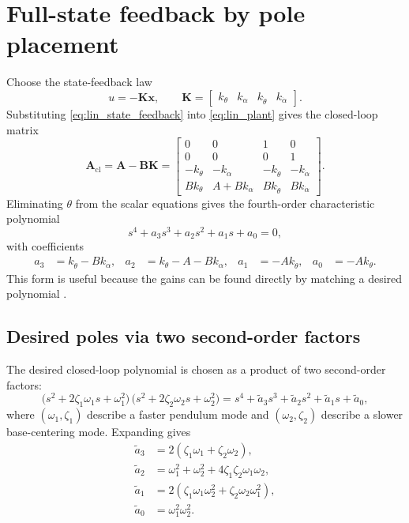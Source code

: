 \section{Full-state feedback by pole placement}
Choose the state-feedback law
\begin{equation}
u = -\mathbf{K}\mathbf{x},\qquad
\mathbf{K}=\begin{bmatrix}k_\theta & k_\alpha & k_{\dot{\theta}} & k_{\dot{\alpha}}\end{bmatrix}.
\label{eq:lin_state_feedback}
\end{equation}
Substituting \eqref{eq:lin_state_feedback} into \eqref{eq:lin_plant} gives the closed-loop matrix
\[
\mathbf{A}_{\mathrm{cl}}=\mathbf{A}-\mathbf{B}\mathbf{K}
=
\begin{bmatrix}
0 & 0 & 1 & 0\\
0 & 0 & 0 & 1\\
-k_\theta & -k_\alpha & -k_{\dot{\theta}} & -k_{\dot{\alpha}}\\
B k_\theta & A + B k_\alpha & B k_{\dot{\theta}} & B k_{\dot{\alpha}}
\end{bmatrix}.
\]
Eliminating $\theta$ from the scalar equations gives the fourth-order characteristic polynomial
\begin{equation}
s^4 + a_3 s^3 + a_2 s^2 + a_1 s + a_0 = 0,
\label{eq:lin_charpoly}
\end{equation}
with coefficients
\begin{align}
a_3 &= k_{\dot{\theta}} - B k_{\dot{\alpha}}, &
a_2 &= k_{\theta} - A - B k_{\alpha}, &
a_1 &= -A k_{\dot{\theta}}, &
a_0 &= -A k_{\theta}.
\label{eq:lin_coeffs}
\end{align}
This form is useful because the gains can be found directly by matching a desired polynomial \cite{ogata_modern_control}.

\subsection{Desired poles via two second-order factors}
The desired closed-loop polynomial is chosen as a product of two second-order factors:
\begin{equation}
\bigl(s^2+2\zeta_1\omega_1 s+\omega_1^2\bigr)\,
\bigl(s^2+2\zeta_2\omega_2 s+\omega_2^2\bigr)
= s^4 + \tilde a_3 s^3 + \tilde a_2 s^2 + \tilde a_1 s + \tilde a_0,
\label{eq:lin_desired_poly}
\end{equation}
where $(\omega_1,\zeta_1)$ describe a faster pendulum mode and $(\omega_2,\zeta_2)$ describe a slower base-centering mode. Expanding gives
\begin{align}
\tilde a_3 &= 2(\zeta_1\omega_1+\zeta_2\omega_2),\nonumber\\
\tilde a_2 &= \omega_1^2+\omega_2^2+4\zeta_1\zeta_2\omega_1\omega_2,\nonumber\\
\tilde a_1 &= 2(\zeta_1\omega_1\omega_2^2+\zeta_2\omega_2\omega_1^2),\nonumber\\
\tilde a_0 &= \omega_1^2\omega_2^2.
\label{eq:lin_desired_coeffs}
\end{align}

